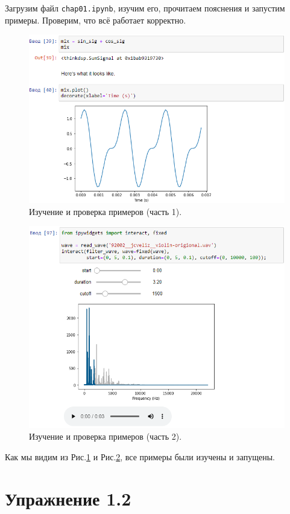 \documentclass[a4paper, 14pt]{extarticle}
\begin{document}
    Загрузим файл \texttt{chap01.ipynb}, изучим его, прочитаем пояснения и запустим примеры.
    Проверим, что всё работает корректно.

    \begin{figure}[h]
        \centering
        \includegraphics[width=0.65\linewidth]{resources/Images/task1_check1}
        \caption{Изучение и проверка примеров (часть 1).}
        \label{fig:task1_check1}
    \end{figure}

    \begin{figure}[h]
        \centering
        \includegraphics[width=0.65\linewidth]{resources/Images/task1_check2}
        \caption{Изучение и проверка примеров (часть 2).}
        \label{fig:task1_check2}
    \end{figure}

    Как мы видим из Рис.\ref{fig:task1_check1} и Рис.\ref{fig:task1_check2}, все примеры были изучены и запущены.

    \newpage

    \section{Упражнение 1.2}
    \label{sec:task2}
\end{document}
